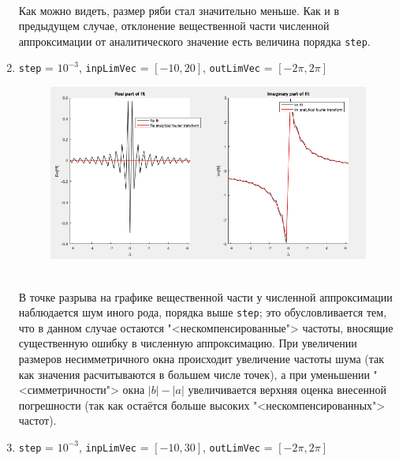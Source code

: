 \documentclass[11pt, oneside, final]{article}
\numberwithin{equation}{section}
\begin{document}
\begin{enumerate}
\begin{figure}[!h]
            \label{pic:f2:2}
        \end{figure} \\
        Как можно видеть, размер ряби стал значительно меньше. Как и в предыдущем случае, отклонение вещественной части численной аппроксимации от аналитического значение
        есть величина порядка \texttt{step}.
        \clearpage
        \item
        \label{it:fftnoise}
        \texttt{step} = \(10^{-3}\), \texttt{inpLimVec} = \( [-10, 20] \), \texttt{outLimVec} = \( [-2\pi, 2\pi] \)
        \begin{figure}[!h]
            \centering
            \includegraphics[width=\linewidth]{f2fig3}
            \label{pic:f2:3}
        \end{figure} \\
        В точке разрыва на графике вещественной части у численной аппроксимации наблюдается шум иного рода, порядка выше \texttt{step}; 
        это обусловливается 
        тем, что в данном случае остаются "<нескомпенсированные"> частоты, вносящие существенную ошибку в численную аппроксимацию. 
        При увеличении размеров несимметричного окна происходит увеличение частоты шума (так как значения расчитываются в большем числе точек), 
        а при уменьшении "<симметричности"> окна \(|b| - |a|\) увеличивается верхняя оценка внесенной погрешности 
        (так как остаётся больше высоких "<нескомпенсированных"> частот).
        \clearpage
        \item
        \label{it:fftmorenoise}
        \texttt{step} = \(10^{-3}\), \texttt{inpLimVec} = \( [-10, 30] \), \texttt{outLimVec} = \( [-2\pi, 2\pi] \)
        \begin{figure}[!h]
            \centering

\end{figure}
\end{enumerate}
\end{document}
